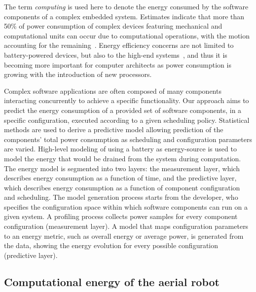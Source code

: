 The term \emph{computing} is used here to denote the energy consumed by the software components of a complex embedded system. Estimates indicate that more than 50\% of power consumption of complex devices featuring mechanical and computational units can occur due to computational operations, with the motion accounting for the remaining~\citep{mei2004energy,mei2005case}. Energy efficiency concerns are not limited to battery-powered devices, but also to the high-end systems~\citep{mudge2001power}, and thus it is becoming more important for computer architects as power consumption is growing with the introduction of new processors. 

Complex software applications are often composed of many components interacting concurrently to achieve a specific functionality. Our approach aims to predict the energy consumption of a provided set of software components, in a specific configuration, executed according to a given scheduling policy. Statistical methods are used to derive a predictive model allowing prediction of the components' total power consumption as scheduling and configuration parameters are varied. High-level modeling of using a battery as energy-source is used to model the energy that would be drained from the system during computation. The energy model is segmented into two layers: the measurement layer, which describes energy consumption as a function of time, and the predictive layer, which describes energy consumption as a function of component configuration and scheduling. The model generation process starts from the developer, who specifies the configuration space within which software components can run on a given system. A profiling process collects power samples for every component configuration (measurement layer). A model that maps configuration parameters to an energy metric, such as overall energy or average power, is generated from the data, showing the energy evolution for every possible configuration (predictive layer).

\subsection{\color{cyan}Computational energy of the aerial robot}

